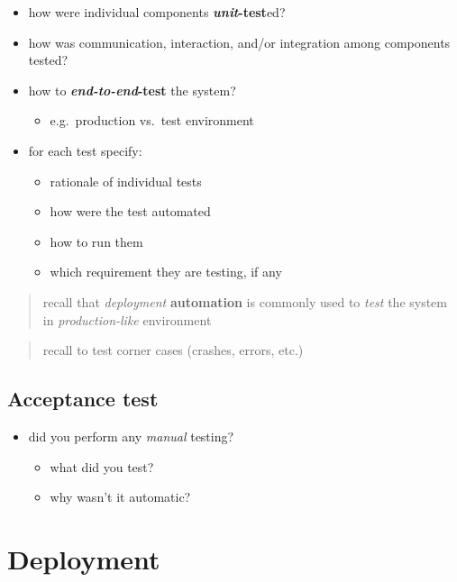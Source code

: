 \documentclass{scrartcl}
\begin{document}
\begin{itemize}
	\item how were individual components \textbf{\emph{unit}-test}ed?
	
	\item how was communication, interaction, and/or integration among components tested?
	
	\item how to \textbf{\emph{end-to-end}-test} the system?
	\begin{itemize}
		\item e.g.~production vs.~test environment
	\end{itemize}
	
	\item for each test specify:
	\begin{itemize}
		\item rationale of individual tests
		\item how were the test automated
		\item how to run them
		\item which requirement they are testing, if any
	\end{itemize}
\end{itemize}

\begin{quote}
	recall that \emph{deployment} \textbf{automation} is commonly used to \emph{test} the system in \emph{production-like} environment
\end{quote}

\begin{quote}
	recall to test corner cases (crashes, errors, etc.)
\end{quote}

\subsection{Acceptance test}\label{acceptance-test}

\begin{itemize}
	\item did you perform any \emph{manual} testing?
	\begin{itemize}
		\item what did you test?
		\item why wasn't it automatic?
	\end{itemize}
\end{itemize}

\section{Deployment}\label{deployment}
\end{document}
